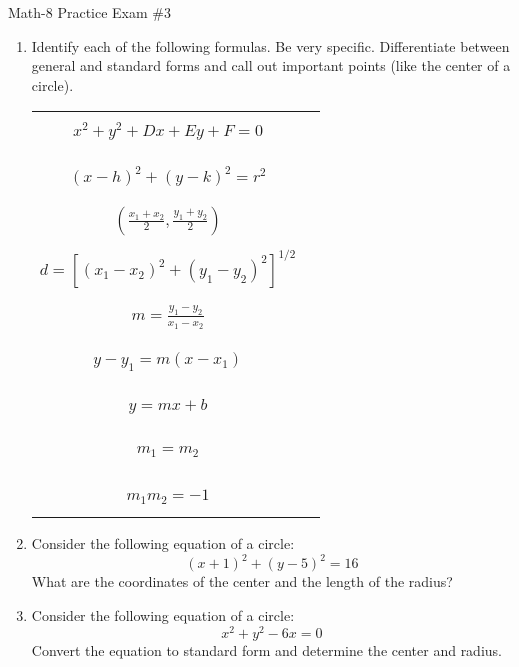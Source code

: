 \documentclass[letterpaper,12pt,fleqn]{article}
\begin{document}
\begin{center}
\Large Math-8 Practice Exam \#3
\end{center}

\vspace{0.5in}

\newcommand{\fillin}{\rule[-10pt]{3in}{1pt}}
\newcommand{\sfillin}{\rule[-10pt]{0.5in}{1pt}}

\begin{enumerate}
\item Identify each of the following formulas. Be very specific.
  Differentiate between general and standard forms and call out important
  points (like the center of a circle).

\vspace{0.25in}

\begin{tabular}{cc}
$x^2+y^2+Dx+Ey+F=0$ & \fillin \\
\\
$(x-h)^2+(y-k)^2=r^2$ & \fillin \\
\\
$\left(\frac{x_1+x_2}{2},\frac{y_1+y_2}{2}\right)$ & \fillin \\
\\
$d=[(x_1-x_2)^2+(y_1-y_2)^2]^{1/2}$ & \fillin \\
\\
$m=\frac{y_1-y_2}{x_1-x_2}$ & \fillin \\
\\
$y-y_1=m(x-x_1)$ & \fillin \\
\\
$y=mx+b$ & \fillin \\
\\
$m_1=m_2$ & \fillin \\
\\
$m_1m_2=-1$ & \fillin \\
\end{tabular}

\newpage

\item Consider the following equation of a circle:
\[(x+1)^2+(y-5)^2=16\]
What are the coordinates of the center and the length of the radius?

\vspace{1in}

\item Consider the following equation of a circle:
  \[x^2+y^2-6x=0\]
  Convert the equation to standard form and determine the center and radius.


\end{enumerate}
\end{document}
